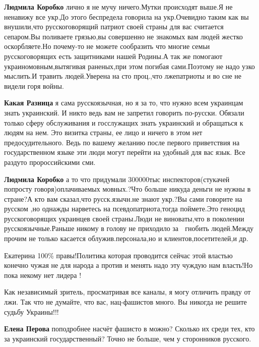 \begin{itemize}
\begin{itemize}

\textbf{Людмила Коробко} лично я не мучу ничего.Мутки происходят выше.Я не
ненавижу все укр.До этого беспредела говорила на укр.Очевидно таким как вы
внушили,что русскоговорящий патриот своей страны для вас считается сепаром.Вы
поливаете грязью,вы совершенно не знакомых вам людей жестко оскорбляете.Но
почему-то не можете сообразить что многие семьи русскоговорящих есть
защитниками нашей Родины.А так же помогают украиномовным,вытягивая раненых,при
этом погибая сами.Поэтому не надо узко мыслить.И травить людей.Уверена на сто
проц.,что лжепатриоты и во сне не видели горя войны.

\textbf{Какая Разница} я сама русскоязычная, но я за то, что нужно всем украинцам знать украинский. И никто ведь вам не запретил говорить по-русски. Обязали только сферу обслуживания и госслужащих знать украинский и обращаться к людям на нем. Это визитка страны, ее лицо и ничего в этом нет предосудительного. Ведь по вашему желанию после первого приветствия на государственном языке эти люди могут перейти на удобный для вас язык. Все раздуто пророссийскими сми.

\textbf{Людмила Коробко} а то что придумали 300000тыс инспекторов(стукачей
попросту говоря)оплачиваемых мовных.?Что больше никуда деньги не нужны в
стране?А кто вам сказал,что русск.язычн.не знают укр.?Вы сами говорите на
русском ,но однажды нарветесь на псевдопатриота,тогда поймете.Это геноцид
русскоговорящих украинцев своей страны.Люди не виноваты,что в поколении
русскоязычные.Раньше никому в голову не приходило за 👅 гнобить людей.Между
прочим не только касается облужив.персонала,но и клиентов,посетителей,и др.
\end{itemize}

Екатерина 100\% правы!Политика которая проводится сейчас этой властью конечно
чужая не для народа а против и менять надо эту чуждую нам власть!Но пока некому
нет лидера !


Как независимый зритель, просматривая все каналы, я могу отличить правду от
лжи. Так что не думайте, что вас, нац-фашистов много. Вы никогда не решите
судьбу Украины!!!

\begin{itemize}
\textbf{Елена Перова} поподробнее насчёт фашисто в можно? Сколько их среди тех, кто за украинский государственный? Точно не больше, чем у сторонников русского.


\end{itemize}
\end{itemize}

